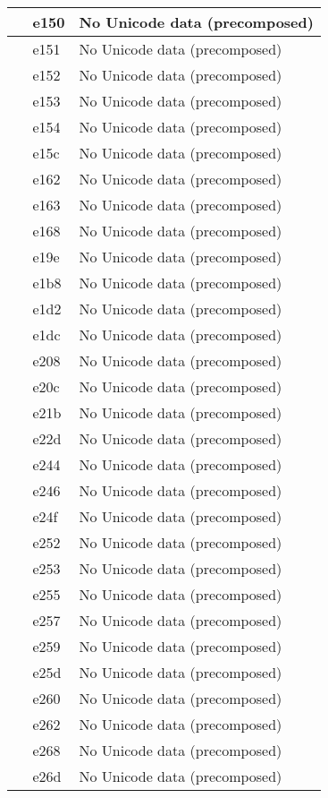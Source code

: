 \documentclass[12pt,letterpaper,openany]{book}
\begin{document}
\begin{center}
\begin{supertabular}{|m{0.25in}|m{0.5in}|m{4in}|}
 & e150 & No Unicode data (precomposed)\\\hline
 & e151 & No Unicode data (precomposed)\\\hline
 & e152 & No Unicode data (precomposed)\\\hline
 & e153 & No Unicode data (precomposed)\\\hline
 & e154 & No Unicode data (precomposed)\\\hline
 & e15c & No Unicode data (precomposed)\\\hline
 & e162 & No Unicode data (precomposed)\\\hline
 & e163 & No Unicode data (precomposed)\\\hline
 & e168 & No Unicode data (precomposed)\\\hline
 & e19e & No Unicode data (precomposed)\\\hline
 & e1b8 & No Unicode data (precomposed)\\\hline
 & e1d2 & No Unicode data (precomposed)\\\hline
 & e1dc & No Unicode data (precomposed)\\\hline
 & e208 & No Unicode data (precomposed)\\\hline
 & e20c & No Unicode data (precomposed)\\\hline
 & e21b & No Unicode data (precomposed)\\\hline
 & e22d & No Unicode data (precomposed)\\\hline
 & e244 & No Unicode data (precomposed)\\\hline
 & e246 & No Unicode data (precomposed)\\\hline
 & e24f & No Unicode data (precomposed)\\\hline
 & e252 & No Unicode data (precomposed)\\\hline
 & e253 & No Unicode data (precomposed)\\\hline
 & e255 & No Unicode data (precomposed)\\\hline
 & e257 & No Unicode data (precomposed)\\\hline
 & e259 & No Unicode data (precomposed)\\\hline
 & e25d & No Unicode data (precomposed)\\\hline
 & e260 & No Unicode data (precomposed)\\\hline
 & e262 & No Unicode data (precomposed)\\\hline
 & e268 & No Unicode data (precomposed)\\\hline
 & e26d & No Unicode data (precomposed)\\\hline

\end{supertabular}
\end{center}
\end{document}
